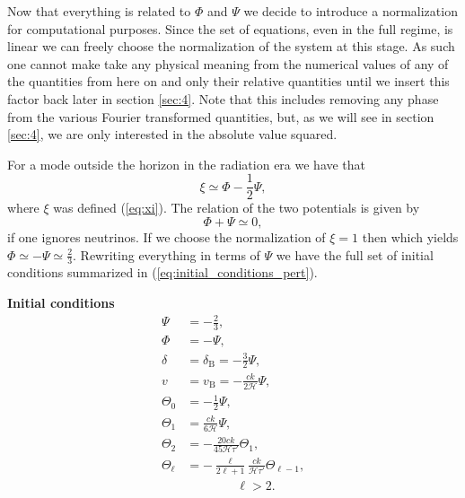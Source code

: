 \documentclass[%
reprint,
 amsmath,amssymb,
 aps,
]{revtex4-2}
\newcommand{\Hp}{\mathcal{H}}
\begin{document}
Now that everything is related to $\Phi$ and $\Psi$ we decide to introduce a normalization for computational purposes. Since the set of equations, even in the full regime, is linear we can freely choose the normalization of the system at this stage. As such one cannot make take any physical meaning from the numerical values of any of the quantities from here on and only their relative quantities until we insert this factor back later in section \ref{sec:4}. Note that this includes removing any phase from the various Fourier transformed quantities, but, as we will see in section \ref{sec:4}, we are only interested in the absolute value squared. 

For a mode outside the horizon in the radiation era we have that
\[\xi\simeq\Phi-\frac{1}{2}\Psi,\]
where $\xi$ was defined (\ref{eq:xi}). The relation of the two potentials is given by \cite{Dodelson:2003ft} 
\[\Phi+\Psi\simeq0,\]
if one ignores neutrinos. If we choose the normalization of $\xi=1$ then which yields $\Phi\simeq-\Psi\simeq\frac{2}{3}$. Rewriting everything in terms of $\Psi$ we have the full set of initial conditions summarized in (\ref{eq:initial_conditions_pert}).
\begin{center}
\begin{tcolorbox}[
	width=0.7\linewidth,
	colback=black!3!white,
	]
	\textbf{Initial conditions}
	\begin{subequations}\label{eq:initial_conditions_pert}
		\begin{align}
			\Psi&=-\frac{2}{3},\\
			\Phi&=-\Psi,\\
			\delta&=\delta_\text{B}=-\frac{3}{2}\Psi,\\
			v&=v_\text{B}=-\frac{ck}{2\Hp}\Psi,\\
			\Theta_0&=-\frac{1}{2}\Psi,\\
			\Theta_1&=\frac{ck}{6\Hp}\Psi,\\
			\Theta_2&=-\frac{20ck}{45\Hp\tau'}\Theta_1,\\
			\Theta_\ell&=-\frac{\ell}{2\ell+1}\frac{ck}{\Hp\tau'}\Theta_{\ell-1},\\
			&\quad\quad\quad\quad\ell>2.\nonumber
		\end{align}
	\end{subequations}
\end{tcolorbox}
\end{center}
\end{document}
